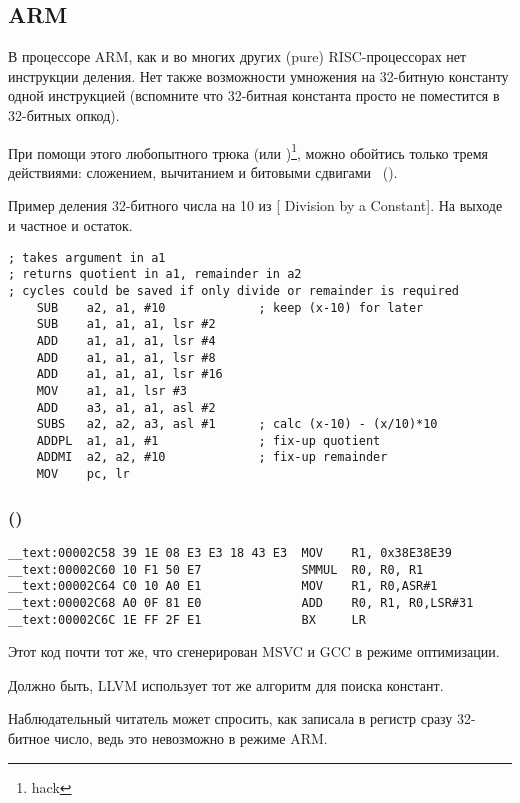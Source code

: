 ﻿\subsection{ARM}

В процессоре ARM, как и во многих других  (pure) RISC-процессорах нет инструкции деления.
Нет также возможности умножения на 32-битную константу одной инструкцией (вспомните что 32-битная
константа просто не поместится в 32-битных опкод).

При помощи этого любопытного трюка (или )\footnote{hack}, можно обойтись только тремя действиями: 
сложением, вычитанием и битовыми сдвигами
~().

Пример деления 32-битного числа на 10 из
[ Division by a Constant].
На выходе и частное и остаток.

\begin{lstlisting}
; takes argument in a1
; returns quotient in a1, remainder in a2
; cycles could be saved if only divide or remainder is required
    SUB    a2, a1, #10             ; keep (x-10) for later
    SUB    a1, a1, a1, lsr #2
    ADD    a1, a1, a1, lsr #4
    ADD    a1, a1, a1, lsr #8
    ADD    a1, a1, a1, lsr #16
    MOV    a1, a1, lsr #3
    ADD    a3, a1, a1, asl #2
    SUBS   a2, a2, a3, asl #1      ; calc (x-10) - (x/10)*10
    ADDPL  a1, a1, #1              ; fix-up quotient
    ADDMI  a2, a2, #10             ; fix-up remainder
    MOV    pc, lr
\end{lstlisting}

\subsubsection{\OptimizingXcodeIV (\ARMMode)}

\begin{lstlisting}
__text:00002C58 39 1E 08 E3 E3 18 43 E3  MOV    R1, 0x38E38E39
__text:00002C60 10 F1 50 E7              SMMUL  R0, R0, R1
__text:00002C64 C0 10 A0 E1              MOV    R1, R0,ASR#1
__text:00002C68 A0 0F 81 E0              ADD    R0, R1, R0,LSR#31
__text:00002C6C 1E FF 2F E1              BX     LR
\end{lstlisting}

Этот код почти тот же, что сгенерирован MSVC и GCC в режиме оптимизации.

Должно быть, LLVM использует тот же алгоритм для поиска констант.

Наблюдательный читатель может спросить, как \MOV записала в регистр сразу 32-битное число, 
ведь это невозможно в режиме ARM.

